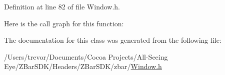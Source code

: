 Definition at line 82 of file Window.h.



Here is the call graph for this function:




The documentation for this class was generated from the following file:\begin{DoxyCompactItemize}
\item 
/Users/trevor/Documents/Cocoa Projects/All-\/Seeing Eye/ZBarSDK/Headers/ZBarSDK/zbar/\hyperlink{_window_8h}{Window.h}\end{DoxyCompactItemize}
